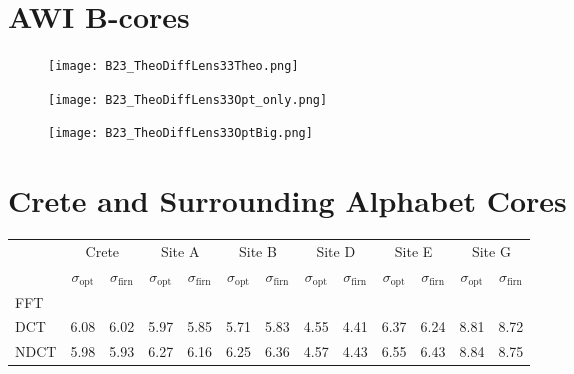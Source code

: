 \documentclass[../../CompleteThesis/Complete_1stDraft]{subfiles}
\begin{document}
	
	\section[AWI B-cores]{AWI B-cores}
	\label{Sec:Results_AWIBcores}
	
	
	
	
	\begin{figure}[h]
		\centering
		\texttt{[image: B23\_TheoDiffLens33Theo.png]}
		\caption[]{}
		\label{fig:B23_BD_Theo}
	\end{figure}
	
	\begin{figure}[h]
		\centering
		\texttt{[image: B23\_TheoDiffLens33Opt\_only.png]}
		\caption[]{}
		\label{fig:B23_BD_OptOnly}
	\end{figure}
	
	\begin{figure}[h]
		\centering
		\texttt{[image: B23\_TheoDiffLens33OptBig.png]}
		\caption[]{}
		\label{fig:B23_BD_OptBig}
	\end{figure}
	
	
	
	
	
	
	
	
	
	
	
	\section[Alphabet Cores]{Crete and Surrounding Alphabet Cores}
	\label{Sec:Results_AlphabetCores}
	
	\begin{table}[ht]
		\centering
		\begin{tabular}{l||*{6}{c | c||}}
			&
			\multicolumn{2}{c}{Crete} & \multicolumn{2}{c}{Site A} & \multicolumn{2}{c}{Site B} & \multicolumn{2}{c}{Site D} & \multicolumn{2}{c}{Site E} & \multicolumn{2}{c||}{Site G} \\
			&
			$\sigma_{\text{opt}}$ & $\sigma_{\text{firn}}$ & $\sigma_{\text{opt}}$ & $\sigma_{\text{firn}}$ & $\sigma_{\text{opt}}$ & $\sigma_{\text{firn}}$ & $\sigma_{\text{opt}}$ & $\sigma_{\text{firn}}$ & $\sigma_{\text{opt}}$ & $\sigma_{\text{firn}}$ & $\sigma_{\text{opt}}$ & $\sigma_{\text{firn}}$ \\
			
			\hline
			FFT & & & & & & & & & & & & \\ 
			DCT & 6.08 & 6.02 & 5.97 & 5.85 & 5.71 & 5.83 & 4.55 & 4.41 & 6.37 & 6.24 & 8.81 & 8.72 \\
			NDCT & 5.98 & 5.93 & 6.27 & 6.16 & 6.25 & 6.36 & 4.57 & 4.43 & 6.55 & 6.43 & 8.84 & 8.75 \\
		\end{tabular}
	\end{table}
	
\end{document}
